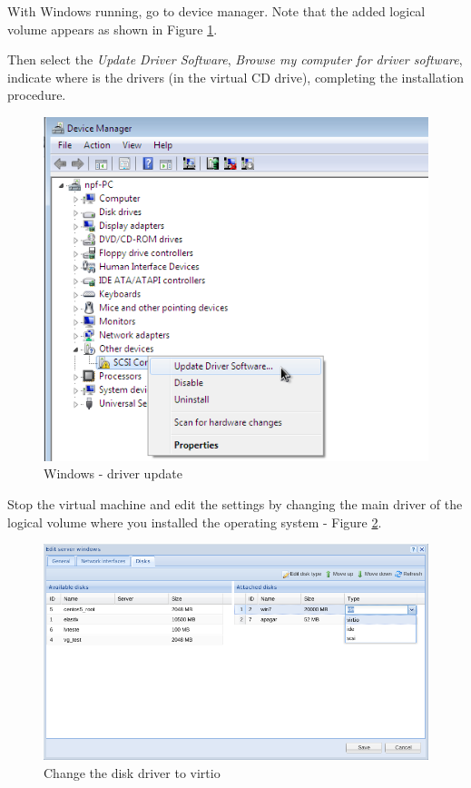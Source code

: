 With Windows running, go to device manager. Note that the added logical volume appears as shown in Figure \ref{fig:virtio10}.

Then select the \textit{Update Driver Software}, \textit{Browse my computer for driver software}, indicate where is the drivers (in the virtual CD drive), completing the installation procedure.

\begin{figure}[H]
	\begin{center}
	\includegraphics[scale=0.5]{screenshots/virtio/virtio_10.png}
	\caption{Windows - driver update}
	\label{fig:virtio10}
	\end{center}
\end{figure}

Stop the virtual machine and edit the settings by changing the main driver of the logical volume where you installed the operating system - Figure \ref{fig:virtio16}.

\begin{figure}[H]
	\begin{center}
	\includegraphics[scale=0.5]{screenshots/virtio/virtio_16.png}
	\caption{Change the disk driver to virtio}
	\label{fig:virtio16}
	\end{center}
\end{figure}

